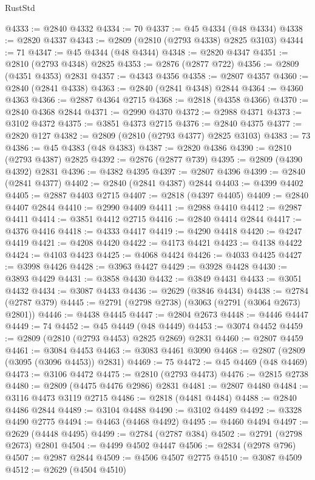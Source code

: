 \begin{lexlean}{RustStd}
\begin{coremodule}
@4333 := @2840 @4332
@4334 := 70
@4337 := @45 @4334 (@48 @4334)
@4338 := @2820 @4337
@4343 := @2809 (@2810 (@2793 @4338) @2825 @3103)
@4344 := 71
@4347 := @45 @4344 (@48 @4344)
@4348 := @2820 @4347
@4351 := @2810 (@2793 @4348) @2825
@4353 := @2876 (@2877 @722)
@4356 := @2809 (@4351 @4353) @2831
@4357 := @4343 @4356
@4358 := @2807 @4357
@4360 := @2840 (@2841 @4338)
@4363 := @2840 (@2841 @4348) @2844
@4364 := @4360 @4363
@4366 := @2887 @4364 @2715
@4368 := @2818 (@4358 @4366)
@4370 := @2840 @4368 @2844
@4371 := @2990 @4370
@4372 := @2988 @4371
@4373 := @3102 @4372
@4375 := @3851 @4373 @2715
@4376 := @2840 @4375
@4377 := @2820 @127
@4382 := @2809 (@2810 (@2793 @4377) @2825 @3103)
@4383 := 73
@4386 := @45 @4383 (@48 @4383)
@4387 := @2820 @4386
@4390 := @2810 (@2793 @4387) @2825
@4392 := @2876 (@2877 @739)
@4395 := @2809 (@4390 @4392) @2831
@4396 := @4382 @4395
@4397 := @2807 @4396
@4399 := @2840 (@2841 @4377)
@4402 := @2840 (@2841 @4387) @2844
@4403 := @4399 @4402
@4405 := @2887 @4403 @2715
@4407 := @2818 (@4397 @4405)
@4409 := @2840 @4407 @2844
@4410 := @2990 @4409
@4411 := @2988 @4410
@4412 := @2987 @4411
@4414 := @3851 @4412 @2715
@4416 := @2840 @4414 @2844
@4417 := @4376 @4416
@4418 := @4333 @4417
@4419 := @4290 @4418
@4420 := @4247 @4419
@4421 := @4208 @4420
@4422 := @4173 @4421
@4423 := @4138 @4422
@4424 := @4103 @4423
@4425 := @4068 @4424
@4426 := @4033 @4425
@4427 := @3998 @4426
@4428 := @3963 @4427
@4429 := @3928 @4428
@4430 := @3893 @4429
@4431 := @3858 @4430
@4432 := @3849 @4431
@4433 := @3051 @4432
@4434 := @3087 @4433
@4436 := @2629 (@3846 @4434)
@4438 := @2784 (@2787 @379)
@4445 := @2791 (@2798 @2738) (@3063 (@2791 (@3064 @2673) @2801))
@4446 := @4438 @4445
@4447 := @2804 @2673
@4448 := @4446 @4447
@4449 := 74
@4452 := @45 @4449 (@48 @4449)
@4453 := @3074 @4452
@4459 := @2809 (@2810 (@2793 @4453) @2825 @2869) @2831
@4460 := @2807 @4459
@4461 := @3084 @4453
@4463 := @3083 @4461 @3090
@4468 := @2807 (@2809 (@3095 (@3096 @4453)) @2831)
@4469 := 75
@4472 := @45 @4469 (@48 @4469)
@4473 := @3106 @4472
@4475 := @2810 (@2793 @4473)
@4476 := @2815 @2738
@4480 := @2809 (@4475 @4476 @2986) @2831
@4481 := @2807 @4480
@4484 := @3116 @4473 @3119 @2715
@4486 := @2818 (@4481 @4484)
@4488 := @2840 @4486 @2844
@4489 := @3104 @4488
@4490 := @3102 @4489
@4492 := @3328 @4490 @2775
@4494 := @4463 (@4468 @4492)
@4495 := @4460 @4494
@4497 := @2629 (@4448 @4495)
@4499 := @2784 (@2787 @384)
@4502 := @2791 (@2798 @2673) @2801
@4504 := @4499 @4502 @4447
@4506 := @2834 (@2978 @796)
@4507 := @2987 @2844
@4509 := @4506 @4507 @2775
@4510 := @3087 @4509
@4512 := @2629 (@4504 @4510)

\end{coremodule}
\end{lexlean}

